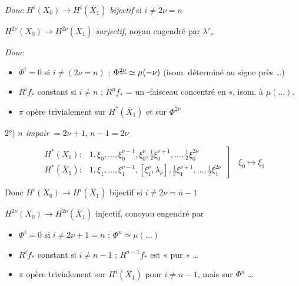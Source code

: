 \documentclass[11pt,a4paper]{article}
\begin{document}
\emph{Donc} $H^i(X_0) \to H^i(\overline{X}_1)$ \emph{bijectif} 
si $i \neq 2\nu = n$

$H^{2\nu}(X_0) \to H^{2\nu}(\overline{X}_1)$ \emph{surjectif}, noyau engendré par
$\lambda'_{\nu}$

\emph{Donc}
\begin{itemize}
  \item[a)] $\Phi^i = 0$ \struck{\ill{}} si $i \neq (2\nu = n)$ ;
  $\Phi^{\uncertain{2\nu}} \simeq \mu(-\nu)$ (isom. déterminé au signe près …)
  \item[b)] $R^i f_*$ constant si $i \neq n$ ; $R^n f_*$ = un \ill{}-faisceau
  concentré en $s$, isom. à $\mu(\ldots)$.
  \item[c)] $\pi$ opère trivialement sur $H^{*}(\overline{X}_1)$ et sur
  $\Phi^{2\nu}$
\end{itemize}

2°) \emph{$n$ impair} $= 2\nu+1$, \quad $n - 1 = 2\nu$

\[
  \left.
  \begin{array}{ll}
    H^{*}(X_0) : & 1, \xi_0, \ldots, \xi_0^{\nu-1}, \xi_0^{\nu},
      \tfrac{1}{2}\xi_0^{\nu+1}, \ldots, \tfrac{1}{2}\xi_0^{2\nu} \\[4pt]
    H^{*}(\overline{X}_1) : & 1, \xi_1, \ldots, \xi_1^{\nu-1}, [\xi_1^{\nu}, \lambda_{\nu}],
      \tfrac{1}{2}\xi_1^{\nu+1}, \ldots, \tfrac{1}{2}\xi_1^{2\nu}
  \end{array}
  \right]
  \quad \xi_0 \mapsto \xi_1
\]

Donc $H^i(X_0) \to H^i(\overline{X}_1)$ bijectif si $i \neq 2\nu = n-1$

$H^{2\nu}(X_0) \to H^{2\nu}(\overline{X}_1)$ injectif, conoyau engendré par
\uncertain{$\lambda_{\nu}$}

\begin{itemize}
  \item[a)] $\Phi^i = 0$ si $i \neq 2\nu + 1 = n$ ; $\Phi^n \simeq \mu(\ldots)$
  \item[b)] $R^i f_*$ constant si $i \neq n-1$ ; $R^{n-1} f_*$ est « pur » …
  \item[c)] $\pi$ opère trivialement sur $H^i(\overline{X}_1)$ pour
  $i \neq n-1$, mais  sur $\Phi^n$ …
\end{itemize}
\end{document}
